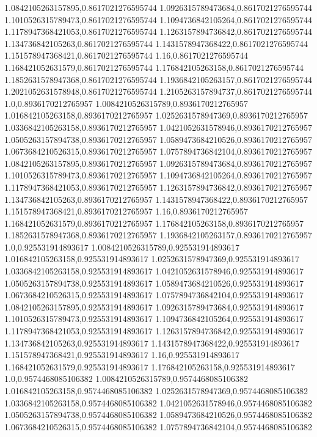 1.0842105263157895,0.8617021276595744
1.0926315789473684,0.8617021276595744
1.1010526315789473,0.8617021276595744
1.1094736842105264,0.8617021276595744
1.1178947368421053,0.8617021276595744
1.1263157894736842,0.8617021276595744
1.134736842105263,0.8617021276595744
1.1431578947368422,0.8617021276595744
1.151578947368421,0.8617021276595744
1.16,0.8617021276595744
1.168421052631579,0.8617021276595744
1.176842105263158,0.8617021276595744
1.1852631578947368,0.8617021276595744
1.1936842105263157,0.8617021276595744
1.2021052631578948,0.8617021276595744
1.2105263157894737,0.8617021276595744
1.0,0.8936170212765957
1.0084210526315789,0.8936170212765957
1.016842105263158,0.8936170212765957
1.0252631578947369,0.8936170212765957
1.0336842105263158,0.8936170212765957
1.0421052631578946,0.8936170212765957
1.0505263157894738,0.8936170212765957
1.0589473684210526,0.8936170212765957
1.0673684210526315,0.8936170212765957
1.0757894736842104,0.8936170212765957
1.0842105263157895,0.8936170212765957
1.0926315789473684,0.8936170212765957
1.1010526315789473,0.8936170212765957
1.1094736842105264,0.8936170212765957
1.1178947368421053,0.8936170212765957
1.1263157894736842,0.8936170212765957
1.134736842105263,0.8936170212765957
1.1431578947368422,0.8936170212765957
1.151578947368421,0.8936170212765957
1.16,0.8936170212765957
1.168421052631579,0.8936170212765957
1.176842105263158,0.8936170212765957
1.1852631578947368,0.8936170212765957
1.1936842105263157,0.8936170212765957
1.0,0.925531914893617
1.0084210526315789,0.925531914893617
1.016842105263158,0.925531914893617
1.0252631578947369,0.925531914893617
1.0336842105263158,0.925531914893617
1.0421052631578946,0.925531914893617
1.0505263157894738,0.925531914893617
1.0589473684210526,0.925531914893617
1.0673684210526315,0.925531914893617
1.0757894736842104,0.925531914893617
1.0842105263157895,0.925531914893617
1.0926315789473684,0.925531914893617
1.1010526315789473,0.925531914893617
1.1094736842105264,0.925531914893617
1.1178947368421053,0.925531914893617
1.1263157894736842,0.925531914893617
1.134736842105263,0.925531914893617
1.1431578947368422,0.925531914893617
1.151578947368421,0.925531914893617
1.16,0.925531914893617
1.168421052631579,0.925531914893617
1.176842105263158,0.925531914893617
1.0,0.9574468085106382
1.0084210526315789,0.9574468085106382
1.016842105263158,0.9574468085106382
1.0252631578947369,0.9574468085106382
1.0336842105263158,0.9574468085106382
1.0421052631578946,0.9574468085106382
1.0505263157894738,0.9574468085106382
1.0589473684210526,0.9574468085106382
1.0673684210526315,0.9574468085106382
1.0757894736842104,0.9574468085106382
